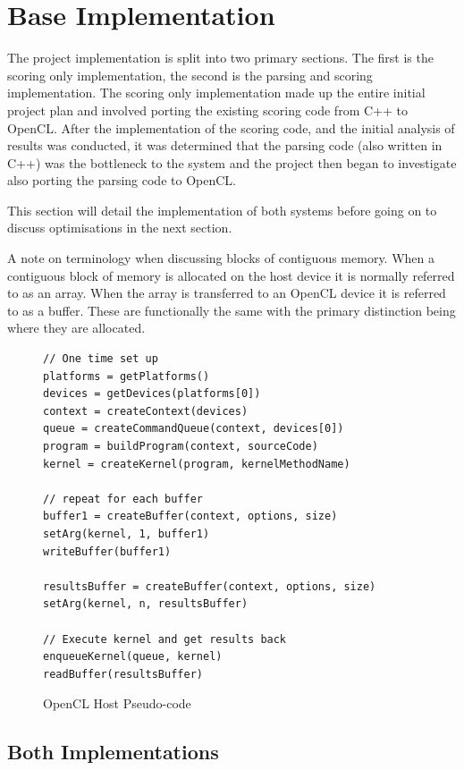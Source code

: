 \section{Base Implementation}

The project implementation is split into two primary sections. The first is the
scoring only implementation, the second is the parsing and scoring
implementation. The scoring only implementation made up the entire initial
project plan and involved porting the existing scoring code from C++ to OpenCL.
After the implementation of the scoring code, and the initial analysis of
results was conducted, it was determined that the parsing code (also written in
C++) was the bottleneck to the system and the project then began to investigate
also porting the parsing code to OpenCL.

This section will detail the implementation of both systems before going on to
discuss optimisations in the next section.

A note on terminology when discussing blocks of contiguous memory. When a
contiguous block of memory is allocated on the host device it is normally
referred to as an array. When the array is transferred to an OpenCL device it is
referred to as a buffer. These are functionally the same with the primary
distinction being where they are allocated.

\begin{figure}[H]
\small\begin{verbatim}
// One time set up
platforms = getPlatforms()
devices = getDevices(platforms[0])
context = createContext(devices)
queue = createCommandQueue(context, devices[0])
program = buildProgram(context, sourceCode)
kernel = createKernel(program, kernelMethodName)

// repeat for each buffer
buffer1 = createBuffer(context, options, size)
setArg(kernel, 1, buffer1)
writeBuffer(buffer1)

resultsBuffer = createBuffer(context, options, size)
setArg(kernel, n, resultsBuffer)

// Execute kernel and get results back
enqueueKernel(queue, kernel)
readBuffer(resultsBuffer)
\end{verbatim}
\caption{OpenCL Host Pseudo-code}
\label{fig:openCLPseudocode}
\end{figure}

\subsection{Both Implementations}

